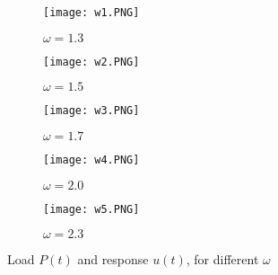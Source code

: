 \documentclass[11pt, a4paper, english, hidelinks]{NTNUoving}
\begin{document}
\begin{figure}
	\begin{subfigure}{.5\textwidth}
		\centering
		\texttt{[image: w1.PNG]}
		\caption{$\omega = 1.3$}
		\label{fig:sfig11}
	\end{subfigure}%
	\begin{subfigure}{.5\textwidth}
		\centering
		\texttt{[image: w2.PNG]}
		\caption{$\omega = 1.5$}
		\label{fig:sfig21}
	\end{subfigure}
	\begin{subfigure}{.5\textwidth}
		\centering
		\texttt{[image: w3.PNG]}
		\caption{$\omega = 1.7$}
		\label{fig:sfig31}
	\end{subfigure}
	\begin{subfigure}{.5\textwidth}
		\centering
		\texttt{[image: w4.PNG]}
		\caption{$\omega = 2.0$}
		\label{fig:sfig41}
	\end{subfigure}
	\begin{subfigure}{\textwidth}
		\centering
		\texttt{[image: w5.PNG]}
		\caption{$\omega = 2.3$}
		\label{fig:sfig51}
	\end{subfigure}
	\caption{Load $P(t)$ and response $u(t)$, for different $\omega$}
	\label{fig:SSresponseP}
\end{figure}
\end{document}
